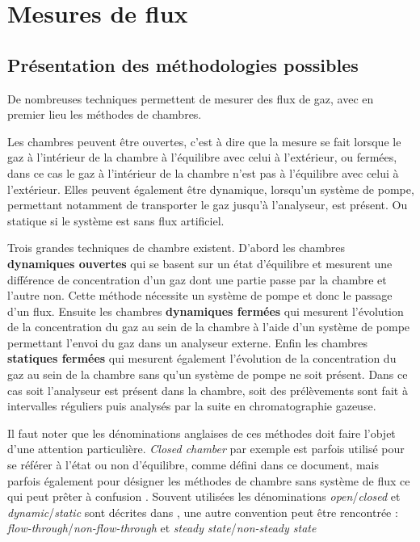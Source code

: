 \section{Mesures de flux}
\label{sec:clsd_chbr_method}

\subsection{Présentation des méthodologies possibles}
De nombreuses techniques permettent de mesurer des flux de gaz, avec en premier lieu les méthodes de chambres.


Les chambres peuvent être ouvertes, c'est à dire que la mesure se fait lorsque le gaz à l'intérieur de la chambre à l'équilibre avec celui à l'extérieur, ou fermées, dans ce cas le gaz à l'intérieur de la chambre n'est pas à l'équilibre avec celui à l'extérieur.
Elles peuvent également être dynamique, lorsqu'un système de pompe, permettant notamment de transporter le gaz jusqu'à l'analyseur, est présent.
Ou statique si le système est sans flux artificiel.

Trois grandes techniques de chambre existent.
D'abord les chambres \textbf{dynamiques ouvertes} qui se basent sur un état d'équilibre et mesurent une différence de concentration d'un gaz dont une partie passe par la chambre et l'autre non. 
Cette méthode nécessite un système de pompe et donc le passage d'un flux.
Ensuite les chambres \textbf{dynamiques fermées} qui mesurent l'évolution de la concentration du gaz au sein de la chambre à l'aide d'un système de pompe permettant l'envoi du gaz dans un analyseur externe.
Enfin les chambres \textbf{statiques fermées} qui mesurent également l'évolution de la concentration du gaz au sein de la chambre sans qu'un système de pompe ne soit présent.
Dans ce cas soit l'analyseur est présent dans la chambre, soit des prélèvements sont fait à intervalles réguliers puis analysés par la suite en chromatographie gazeuse.

Il faut noter que les dénominations anglaises de ces méthodes doit faire l'objet d'une attention particulière.
\textit{Closed chamber} par exemple est parfois utilisé pour se référer à l'état ou non d'équilibre, comme défini dans ce document, mais parfois également pour désigner les méthodes de chambre sans système de flux ce qui peut prêter à confusion \cite{pumpanen2004}.
Souvent utilisées les dénominations \textit{open}/\textit{closed} et \textit{dynamic}/\textit{static} sont décrites dans \cite{luo2006161}, une autre convention peut être rencontrée : \textit{flow-through}/\textit{non-flow-through} et \textit{steady state}/\textit{non-steady state} \cite{livingston1995}


